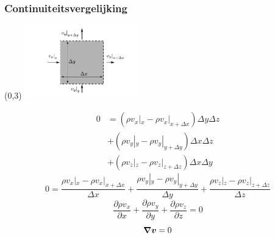 \documentclass[t]{beamer}
\begin{document}
	\begin{frame}
		\frametitle{Continuiteitsvergelijking}
		\begin{textblock}{5}(0,3)
            \includegraphics[width=5cm]{fig/deeltjesvergelijkingen/Continuiteitsvergelijking}
        \end{textblock}
  		\pause
  		\vspace{1.5cm}
  		\begin{align*}
			0 &= (\rho v_x|_{x} - \rho v_x|_{x+\Delta x})\Delta y \Delta z \\
			  &+ (\rho v_y|_{y} - \rho v_y|_{y+\Delta y})\Delta x \Delta z \\
			  &+ (\rho v_z|_{z} - \rho v_z|_{z+\Delta z})\Delta x \Delta y
		\end{align*}
		\pause
		\begin{equation*}
			0 = \frac{\rho v_x|_{x} - \rho v_x|_{x+\Delta x}}{\Delta x} + \frac{\rho v_y|_{y} - \rho v_y|_{y+\Delta y}}{\Delta y} + \frac{\rho v_z|_{z} - \rho v_z|_{z+\Delta z}}{\Delta z}
		\end{equation*}
		\pause
		\begin{equation*}
			\frac{\partial \rho v_x}{\partial x} + \frac{\partial \rho v_y}{\partial y} + \frac{\partial \rho v_z}{\partial z} = 0
		\end{equation*}
		\pause
		\begin{equation}
			\boldsymbol{\nabla} \boldsymbol{v} = 0
		\end{equation}
	\end{frame}	
\end{document}
